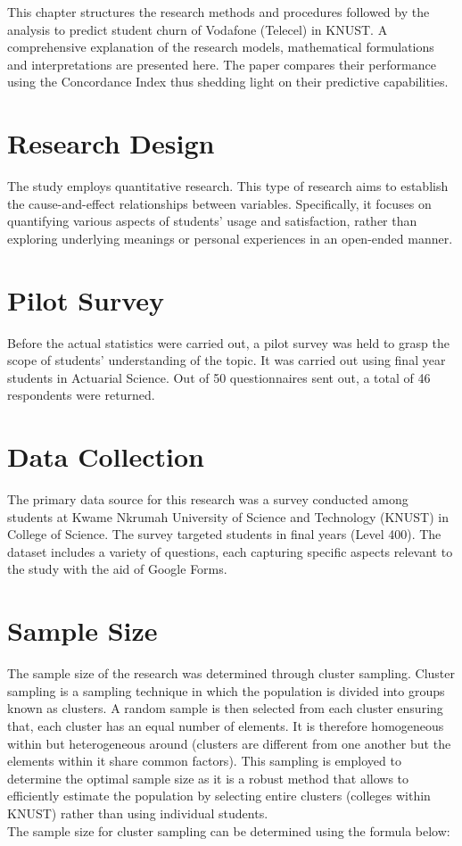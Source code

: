 \documentclass[doublespacing]{report} %
\begin{document}
This chapter structures the research methods and procedures followed by the analysis to predict student churn of Vodafone (Telecel) in KNUST. A comprehensive explanation of the research models, mathematical formulations and interpretations are presented here. The paper compares their performance using the Concordance Index thus shedding light on their predictive capabilities.

\section{Research Design}

The study employs quantitative research. This type of research aims to establish the cause-and-effect relationships between variables. Specifically, it focuses on quantifying various aspects of students’ usage and satisfaction, rather than exploring underlying meanings or personal experiences in an open-ended manner.

\section{Pilot Survey}

Before the actual statistics were carried out, a pilot survey was held to grasp the scope of students’ understanding of the topic. It was carried out using final year students in Actuarial Science. Out of 50 questionnaires sent out, a total of 46 respondents were returned. 

\section{Data Collection}

The primary data source for this research was a survey conducted among students at Kwame Nkrumah University of Science and Technology (KNUST) in College of Science. The survey targeted students in final years (Level 400). The dataset includes a variety of questions, each capturing specific aspects relevant to the study with the aid of Google Forms.


\section{Sample Size}

The sample size of the research was determined through cluster sampling. Cluster sampling is a sampling technique in which the population is divided into groups known as clusters. A random sample is then selected from each cluster ensuring that, each cluster has an equal number of elements. It is therefore homogeneous within but heterogeneous around (clusters are different from one another but the elements within it share common factors). This sampling is employed to determine the optimal sample size as it is a robust method that allows to efficiently estimate the population by selecting entire clusters (colleges within KNUST) rather than using individual students.
\\The sample size for cluster sampling can be determined using the formula below:
\end{document}
